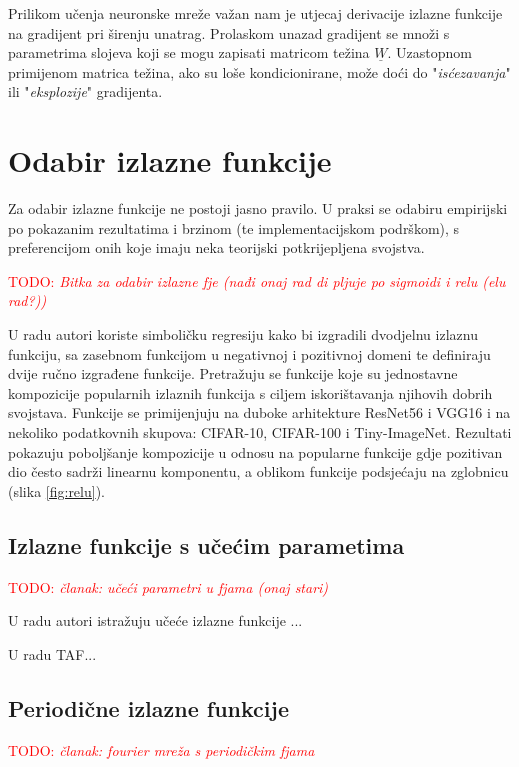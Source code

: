 \documentclass[times, utf8, numeric, diplomski]{fer}
\def\mat#1{\underline{#1}}
\def\figref#1{(slika \ref{#1})}
\def\TODO#1{\noindent\textcolor{red}{TODO: \textit{#1}}\newline}
\def\todo#1{\TODO{#1}}
\begin{document}
Prilikom učenja neuronske mreže važan nam je utjecaj derivacije izlazne funkcije na gradijent pri širenju unatrag. Prolaskom unazad gradijent se množi s parametrima slojeva koji se mogu zapisati matricom težina $\mat{W}$. Uzastopnom primijenom matrica težina, ako su loše kondicionirane, može doći do "\textit{isćezavanja}" ili "\textit{eksplozije}" gradijenta.

\section{Odabir izlazne funkcije}
Za odabir izlazne funkcije ne postoji jasno pravilo. U praksi se odabiru empirijski po pokazanim rezultatima i brzinom (te implementacijskom podrškom), s preferencijom onih koje imaju neka teorijski potkrijepljena svojstva.

\todo{Bitka za odabir izlazne fje (nađi onaj rad di pljuje po sigmoidi i relu (elu rad?))}

U radu \citet{elish} autori koriste simboličku regresiju kako bi izgradili dvodjelnu izlaznu funkciju, sa zasebnom funkcijom u negativnoj i pozitivnoj domeni te definiraju dvije ručno izgrađene funkcije. Pretražuju se funkcije koje su jednostavne kompozicije popularnih izlaznih funkcija s ciljem iskorištavanja njihovih dobrih svojstava. Funkcije se primijenjuju na duboke arhitekture ResNet56 i VGG16 i na nekoliko podatkovnih skupova: CIFAR-10, CIFAR-100 i Tiny-ImageNet. Rezultati pokazuju poboljšanje kompozicije u odnosu na popularne funkcije gdje pozitivan dio često sadrži linearnu komponentu, a oblikom funkcije podsjećaju na zglobnicu \figref{fig:relu}.

\subsection{Izlazne funkcije s učećim parametima}
\todo{članak: učeći parametri u fjama (onaj stari)}

U radu \citet{trained_func} autori istražuju učeće izlazne funkcije ...

U radu TAF...

\subsection{Periodične izlazne funkcije}
\todo{članak: fourier mreža s periodičkim fjama}
\end{document}
